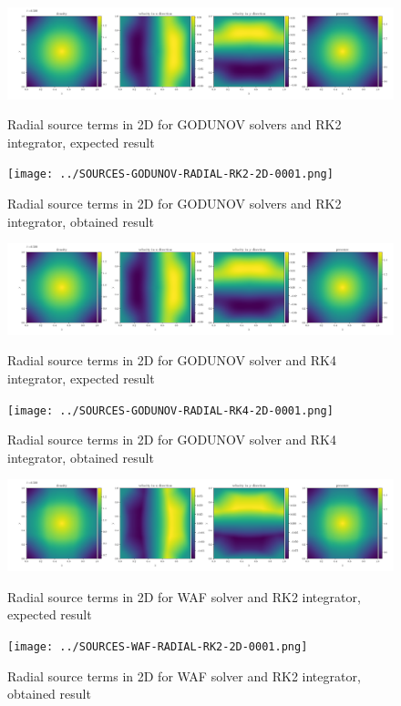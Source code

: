     \begin{figure}[htbp]
        \centering
        \includegraphics[width=.9\textwidth]{./figures/SOURCES-GODUNOV-RADIAL-RK2-2D-0001.png}%
        \caption{Radial source terms in 2D for GODUNOV solvers and RK2 integrator, expected result}
        \texttt{[image: ../SOURCES-GODUNOV-RADIAL-RK2-2D-0001.png]}%
        \caption{Radial source terms in 2D for GODUNOV solvers and RK2 integrator, obtained result}
    \end{figure}

    \begin{figure}[htbp]
        \centering
        \includegraphics[width=.9\textwidth]{./figures/SOURCES-GODUNOV-RADIAL-RK4-2D-0001.png}%
        \caption{Radial source terms in 2D for GODUNOV solver and RK4 integrator, expected result}
        \texttt{[image: ../SOURCES-GODUNOV-RADIAL-RK4-2D-0001.png]}%
        \caption{Radial source terms in 2D for GODUNOV solver and RK4 integrator, obtained result}
    \end{figure}



    \begin{figure}[htbp]
        \centering
        \includegraphics[width=.9\textwidth]{./figures/SOURCES-WAF-RADIAL-RK2-2D-0001.png}%
        \caption{Radial source terms in 2D for WAF solver and RK2 integrator, expected result}
        \texttt{[image: ../SOURCES-WAF-RADIAL-RK2-2D-0001.png]}%
        \caption{Radial source terms in 2D for WAF solver and RK2 integrator, obtained result}
    \end{figure}

